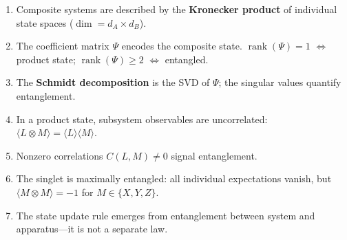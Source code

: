 \documentclass[12pt,a4paper]{article}
\begin{document}
\begin{enumerate}[nosep]
    \item Composite systems are described by the \textbf{Kronecker product} of individual state spaces ($\dim = d_A \times d_B$).
    \item The coefficient matrix $\Psi$ encodes the composite state.  $\operatorname{rank}(\Psi) = 1$ $\Leftrightarrow$ product state; $\operatorname{rank}(\Psi) \geq 2$ $\Leftrightarrow$ entangled.
    \item The \textbf{Schmidt decomposition} is the SVD of $\Psi$; the singular values quantify entanglement.
    \item In a product state, subsystem observables are uncorrelated: $\langle L \otimes M \rangle = \langle L \rangle\langle M \rangle$.
    \item Nonzero correlations $C(L,M)\neq 0$ signal entanglement.
    \item The singlet is maximally entangled: all individual expectations vanish, but $\langle M \otimes M \rangle = -1$ for $M \in \{X,Y,Z\}$.
    \item The state update rule emerges from entanglement between system and apparatus---it is not a separate law.
\end{enumerate}
\end{document}
